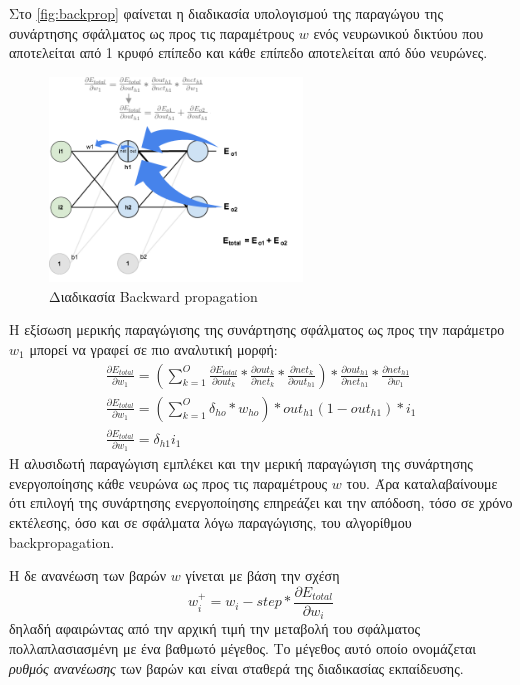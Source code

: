 Στο \autoref{fig:backprop} φαίνεται η διαδικασία υπολογισμού της παραγώγου της συνάρτησης
σφάλματος ως προς τις παραμέτρους $w$
ενός νευρωνικού δικτύου που αποτελείται από 1 κρυφό επίπεδο και κάθε επίπεδο
αποτελείται από δύο νευρώνες.

\begin{figure}[!ht]
  \centering
  \hspace*{2cm}
  \includegraphics[width=0.6\textwidth]{./images/chapter3/backprop.png}
  \caption[Διαδικασία Backward propagation]{Διαδικασία Backward propagation}
  \label{fig:backprop}
\end{figure}

Η εξίσωση μερικής παραγώγισης της συνάρτησης σφάλματος ως προς την παράμετρο
$w_{1}$ μπορεί να γραφεί σε πιο αναλυτική μορφή:
\begin{gather*}
  \frac{\partial E_{total}}{\partial w_{1}} = (\sum_{k=1}^{O}\frac{\partial E_{total}}{\partial out_{k}}*\frac{\partial out_{k}}{\partial net_{k}}*\frac{\partial net_{k}}{\partial out_{h1}})*\frac{\partial out_{h1}}{\partial net_{h1}}*\frac{\partial net_{h1}}{\partial w_{1}} \\
  \frac{\partial E_{total}}{\partial w_{1}} = (\sum_{k=1}^{O}\delta_{ho}*w_{ho}) * out_{h1}(1-out_{h1}) * i_{1} \\
  \frac{\partial E_{total}}{\partial w_{1}} = \delta_{h1}i_{1}
\end{gather*}
Η αλυσιδωτή παραγώγιση εμπλέκει και την μερική παραγώγιση της
συνάρτησης ενεργοποίησης κάθε νευρώνα ως προς τις παραμέτρους $w$ του.
Άρα καταλαβαίνουμε ότι επιλογή της
συνάρτησης ενεργοποίησης επηρεάζει και την απόδοση, τόσο σε χρόνο εκτέλεσης,
όσο και σε σφάλματα λόγω παραγώγισης, του αλγορίθμου backpropagation.

Η δε ανανέωση των βαρών $w$ γίνεται με βάση την σχέση
\begin{equation*}
  w_{i}^{+} = w_{i} - step * \frac{\partial E_{total}}{\partial w_{i}}
\end{equation*}
δηλαδή αφαιρώντας από την αρχική τιμή την μεταβολή του σφάλματος πολλαπλασιασμένη
με ένα βαθμωτό μέγεθος. Το μέγεθος αυτό οποίο ονομάζεται \emph{ρυθμός ανανέωσης}
των βαρών και είναι σταθερά της διαδικασίας εκπαίδευσης.

